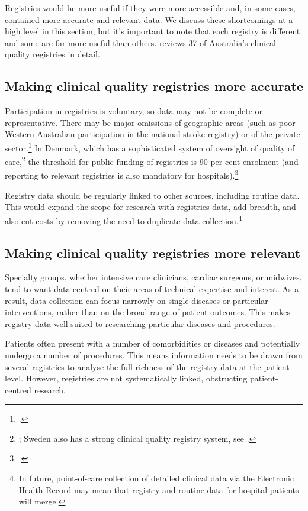\documentclass[FrontPage]{grattan}
\begin{document}
Registries would be more useful if they were more accessible and, in some cases, contained more accurate and relevant data. We discuss these shortcomings at a high level in this section, but it’s important to note that each registry is different and some are far more useful than others.  reviews 37 of Australia’s clinical quality registries in detail.

\subsection{Making clinical quality registries more accurate}\label{subsec:registryaccurate}
Participation in registries is voluntary, so data may not be complete or representative. There may be major omissions of geographic areas (such as poor Western Australian participation in the national stroke registry) or of the private sector.\footcite{RN31}
In Denmark, which has a sophisticated system of oversight of quality of care,\footnote{\textcite{RN32}; Sweden also has a strong clinical quality registry system, see \textcite{RN33}.}
the threshold for public funding of registries is 90 per cent enrolment (and reporting to relevant registries is also mandatory for hospitals).\footcites{RN36}{RN35}{RN34}

Registry data should be regularly linked to other sources, including routine data. This would expand the scope for research with registries data, add breadth, and also cut costs by removing the need to duplicate data collection.\footnote{In future, point-of-care collection of detailed clinical data via the Electronic Health Record may mean that registry and routine data for hospital patients will merge.}

\subsection{Making clinical quality registries more relevant}\label{subsec:registryrelevant}
Specialty groups, whether intensive care clinicians, cardiac surgeons, or midwives, tend to want data centred on their areas of technical expertise and interest. As a result, data collection can focus narrowly on single diseases or particular interventions, rather than on the broad range of patient outcomes. This makes registry data well suited to researching particular diseases and procedures.

Patients often present with a number of comorbidities or diseases and potentially undergo a number of procedures. This means information needs to be drawn from several registries to analyse the full richness of the registry data at the patient level. However, registries are not systematically linked, obstructing patient-centred research.
\end{document}
